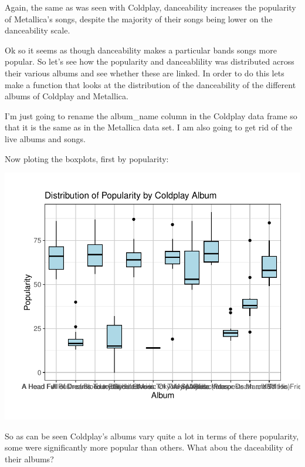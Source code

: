 \documentclass[11pt,preprint, authoryear]{elsarticle}
\numberwithin{equation}{section}
\numberwithin{figure}{section}
\numberwithin{table}{section}
\begin{document}
Again, the same as was seen with Coldplay, danceability increases the
popularity of Metallica's songs, despite the majority of their songs
being lower on the danceability scale.

Ok so it seems as though danceability makes a particular bands songs
more popular. So let's see how the popularity and danceablility was
distributed across their various albums and see whether these are
linked. In order to do this lets make a function that looks at the
distribution of the danceability of the different albums of Coldplay and
Metallica.

I'm just going to rename the album\_name column in the Coldplay data
frame so that it is the same as in the Metallica data set. I am also
going to get rid of the live albums and songs.

Now ploting the boxplots, first by popularity:

\includegraphics{Question_3_files/figure-latex/unnamed-chunk-7-1.pdf}

So as can be seen Coldplay's albums vary quite a lot in terms of there
popularity, some were significantly more popular than others. What abou
the daceability of their albums?
\end{document}
